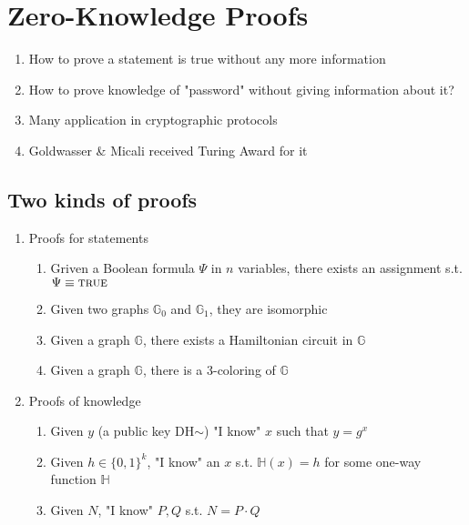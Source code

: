 \documentclass{report}
\begin{document}
\section{Zero-Knowledge Proofs}
\begin{adjustwidth}{2em}{2em}
	\begin{enumerate}[-]
		\item How to prove a statement is true without any more information
		\item How to prove knowledge of "password" without giving information about it?
		\item Many application in cryptographic protocols
		\item Goldwasser \& Micali received Turing Award for it
	\end{enumerate}
	\subsection{Two kinds of proofs}
	\begin{enumerate}[\small\textbullet]
		\item Proofs for statements
		\begin{enumerate}[-]
		 \item Griven a Boolean formula $\Psi$ in $n$ variables, there exists an assignment s.t. $\Psi \equiv \textsc{true}$
		 \item Given two graphs $\mathbb{G}_0$ and $\mathbb{G}_1$, they are isomorphic
		 \item Given a graph $\mathbb{G}$, there exists a Hamiltonian circuit in $\mathbb{G}$
		 \item Given a graph $\mathbb{G}$, there is a 3-coloring of $\mathbb{G}$
		\end{enumerate}
		\item Proofs of knowledge
		\begin{enumerate}[-]
		 \item Given $y$ (a public key DH$\sim$) "I know" $x$ such that $y = g^x$
		 \item Given $h \in \{ 0,1 \}^k$, "I know" an $x$ s.t. $\mathbb{H}(x) = h$ for some one-way function $\mathbb{H}$
		 \item Given $N$, "I know" $P, Q$ s.t. $N = P \cdot Q$
		\end{enumerate}
	\end{enumerate}
\end{adjustwidth}
\end{document}
